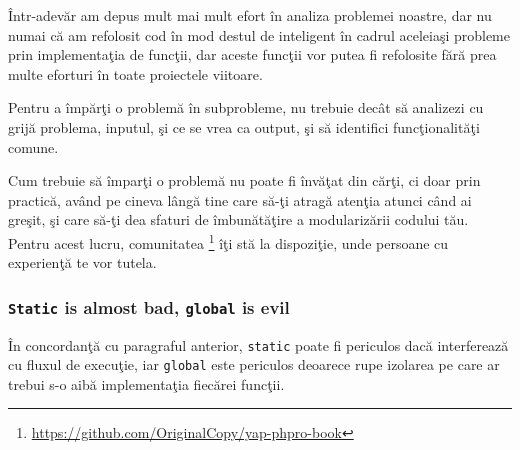 Într-adevăr am depus mult mai mult efort în analiza problemei noastre, dar
nu numai că am refolosit cod în mod destul de inteligent în
cadrul aceleiaşi probleme prin implementaţia
de funcţii, dar aceste funcţii vor putea fi refolosite fără prea multe
eforturi în toate proiectele viitoare.

Pentru a împărţi o problemă în subprobleme, nu trebuie decât să analizezi
cu grijă problema, inputul, şi ce se vrea ca output, şi să identifici
funcţionalităţi comune.

Cum trebuie să împarţi o problemă nu poate fi învăţat din cărţi, ci doar
prin practică, având pe cineva lângă tine care să-ţi atragă atenţia
atunci când ai greşit, şi care să-ţi dea sfaturi de îmbunătăţire
a modularizării codului tău. Pentru acest lucru, comunitatea
{\phpro}\footnote{\url{https://github.com/OriginalCopy/yap-phpro-book}}
îţi stă la dispoziţie, unde persoane cu experienţă te vor tutela.


\subsubsection{\texttt{Static} is almost bad, \texttt{global} is evil}
În concordanţă cu paragraful anterior, \texttt{static} poate fi periculos
dacă interferează cu fluxul de execuţie, iar \texttt{global} este
periculos deoarece rupe izolarea pe care ar trebui s-o aibă implementaţia
fiecărei funcţii.

